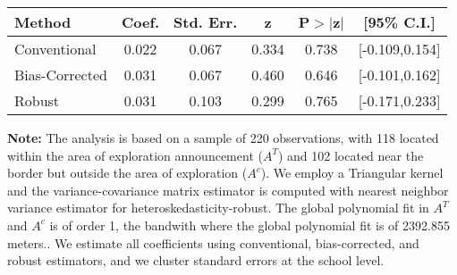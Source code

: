 \begin{table}[htbp]\centering
 \footnotesize 
\begin{tabular}{lccccc}
\hline\hline
Method & Coef. & Std. Err. & z & P$>|$z$|$ & [95\% C.I.] \\ 
\hline \hline  
Conventional & 0.022 & 0.067 & 0.334 & 0.738 & [-0.109,0.154] \\ 
 Bias-Corrected & 0.031 & 0.067 & 0.460 & 0.646 & [-0.101,0.162] \\ 
Robust & 0.031 & 0.103 & 0.299 & 0.765 & [-0.171,0.233] \\ 
  \hline\hline
\end{tabular}
\label{table:rd}
\begin{tablenotes} 
  \justifying \tiny \textbf{Note: }    
   The analysis is based on a sample of 220 observations, with 118 located within the area of exploration announcement ($A^{T}$) and 102 located near the border but outside the area of exploration  ($A^{c}$). 
           We employ a Triangular kernel and the variance-covariance matrix estimator is computed with nearest neighbor variance estimator for heteroskedasticity-robust. The global polynomial fit in  $A^{T}$ and $A^{c}$ is of order 1, the bandwith where the global polynomial fit is of 2392.855 meters.. We estimate all coefficients using conventional, bias-corrected, and robust estimators, and we cluster standard errors at the school level. \end{tablenotes} 
 \end{table} 
